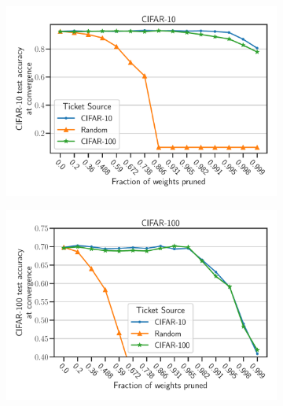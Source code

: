     \begin{figure}[h]
            \begin{subfigure}[b]{0.45\textwidth}
                    \includegraphics[width=\linewidth]{../openreview/plots/Exp2_VGG_CIFAR10_N.pdf}
            \end{subfigure}
            \begin{subfigure}[b]{0.45\textwidth}
                    \includegraphics[width=\linewidth]{../openreview/plots/Exp2_VGG_CIFAR100_N1.pdf}
            \end{subfigure}
           \centering

\end{figure}
